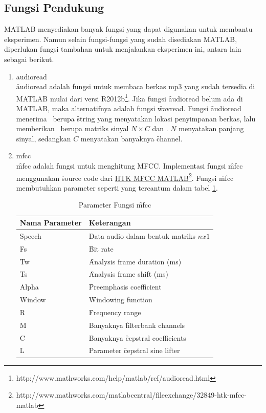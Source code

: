   \subsection{Fungsi Pendukung} \label{chap:fungsipendukung}
  MATLAB menyediakan banyak fungsi yang dapat digunakan untuk membantu eksperimen. Namun selain fungsi-fungsi yang sudah disediakan MATLAB, diperlukan fungsi tambahan untuk menjalankan eksperimen ini, antara lain sebagai berikut.
  \begin{enumerate}
    \item audioread\\
    \f{audioread} adalah fungsi untuk membaca berkas mp3 yang sudah tersedia di MATLAB mulai dari versi R2012b\footnote{http://www.mathworks.com/help/matlab/ref/audioread.html}. Jika fungsi \f{audioread} belum ada di MATLAB, maka alternatifnya adalah fungsi \f{wavread}. Fungsi \f{audioread} menerima \ioa~berupa \f{string} yang menyatakan lokasi penyimpanan berkas, lalu memberikan \iob~berupa matriks sinyal $N \times C$ dan \br. $N$ menyatakan panjang sinyal, sedangkan $C$ menyatakan banyaknya \f{channel}.

    \item mfcc\\
    \f{mfcc} adalah fungsi untuk menghitung MFCC. Implementasi fungsi \f{mfcc} menggunakan \f{source code} dari \href{http://www.mathworks.com/matlabcentral/fileexchange/32849-htk-mfcc-matlab}{HTK MFCC MATLAB}\footnote{http://www.mathworks.com/matlabcentral/fileexchange/32849-htk-mfcc-matlab}. Fungsi \f{mfcc} membutuhkan parameter seperti yang tercantum dalam tabel \ref{table:parametermfcc}.

    \begin{table}
      \centering
      \caption{Parameter Fungsi \f{mfcc}}
      \begin{tabular}{|l|l|}
        \hline
        \textbf{Nama Parameter} & \textbf{Keterangan} \\ \hline
        Speech & Data audio dalam bentuk matriks $nx1$ \\ \hline
        Fs & \f{Bit rate} \\ \hline
        Tw & \f{Analysis frame duration} (ms) \\ \hline
        Ts & \f{Analysis frame shift} (ms) \\ \hline
        Alpha & \f{Preemphasis coefficient} \\ \hline
        Window & \f{Windowing function} \\ \hline
        R & \f{Frequency range} \\ \hline
        M & Banyaknya \f{filterbank channels} \\ \hline
        C & Banyaknya \f{cepstral coefficients} \\ \hline
        L & Parameter \f{cepstral sine lifter} \\ \hline
      \end{tabular}
      \label{table:parametermfcc}
    \end{table}


\end{enumerate}
